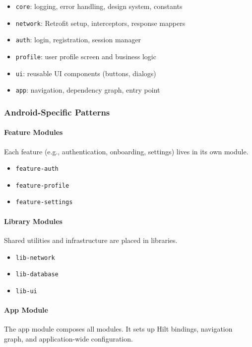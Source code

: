 \documentclass[a4paper,12pt]{article}
\begin{document}
\begin{itemize}
  \item \texttt{core}: logging, error handling, design system, constants
  \item \texttt{network}: Retrofit setup, interceptors, response mappers
  \item \texttt{auth}: login, registration, session manager
  \item \texttt{profile}: user profile screen and business logic
  \item \texttt{ui}: reusable UI components (buttons, dialogs)
  \item \texttt{app}: navigation, dependency graph, entry point
\end{itemize}

\subsubsection{Android-Specific Patterns}

\paragraph{Feature Modules}
Each feature (e.g., authentication, onboarding, settings) lives in its own module.

\begin{itemize}
  \item \texttt{feature-auth}
  \item \texttt{feature-profile}
  \item \texttt{feature-settings}
\end{itemize}

\paragraph{Library Modules}
Shared utilities and infrastructure are placed in libraries.

\begin{itemize}
  \item \texttt{lib-network}
  \item \texttt{lib-database}
  \item \texttt{lib-ui}
\end{itemize}

\paragraph{App Module}
The app module composes all modules. It sets up Hilt bindings, navigation graph, and application-wide configuration.
\end{document}
